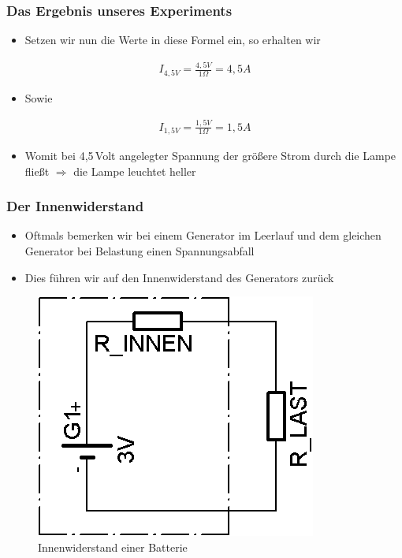 \begin{frame}
  \frametitle{Das Ergebnis unseres Experiments}
  \begin{itemize}
    \item Setzen wir nun die Werte in diese Formel ein, so erhalten wir
  \end{itemize}
  \begin{align}
    I_{4,5 V} = \frac{4,5 V}{1 \Omega} = 4,5 A
  \end{align}
  \begin{itemize}
    \item Sowie
  \end{itemize}
  \begin{align}
    I_{1,5 V} = \frac{1,5 V}{1 \Omega} = 1,5 A
  \end{align}
  \begin{itemize}
    \item Womit bei 4,5\,Volt angelegter Spannung der größere Strom durch die Lampe fließt $\Rightarrow$ die Lampe leuchtet heller
  \end{itemize}
\end{frame}

\begin{frame}
  \frametitle{Der Innenwiderstand}
  \begin{itemize}
    \item Oftmals bemerken wir bei einem Generator im Leerlauf und dem gleichen Generator bei Belastung einen Spannungsabfall
    \item Dies führen wir auf den Innenwiderstand des Generators zurück
  \end{itemize}
  \begin{center}
    \begin{figure}
      \includegraphics[scale=1.4]{e03/Innenwiderstand.png}
      \caption{Innenwiderstand einer Batterie}
    \end{figure}
  \end{center}
\end{frame}


